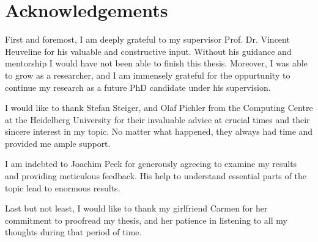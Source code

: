 \chapter*{Acknowledgements}
\thispagestyle{empty}

First and foremost, I am deeply grateful to my supervisor Prof. Dr. Vincent Heuveline for his valuable and constructive input.
Without his guidance and mentorship I would have not been able to finish this thesis.
Moreover, I was able to grow as a researcher, and I am immensely grateful for the oppurtunity to continue my research as a future PhD candidate under his supervision.

I would like to thank Stefan Steiger, and Olaf Pichler from the Computing Centre at the Heidelberg University for their invaluable advice at crucial times and their sincere interest in my topic.
No matter what happened, they always had time and provided me ample support.

I am indebted to Joachim Peek for generously agreeing to examine my results and providing meticulous feedback.
His help to understand essential parts of the topic lead to enormous results.

Last but not least, I would like to thank my girlfriend Carmen for her commitment to proofread my thesis, and her patience in listening to all my thoughts during that period of time.
